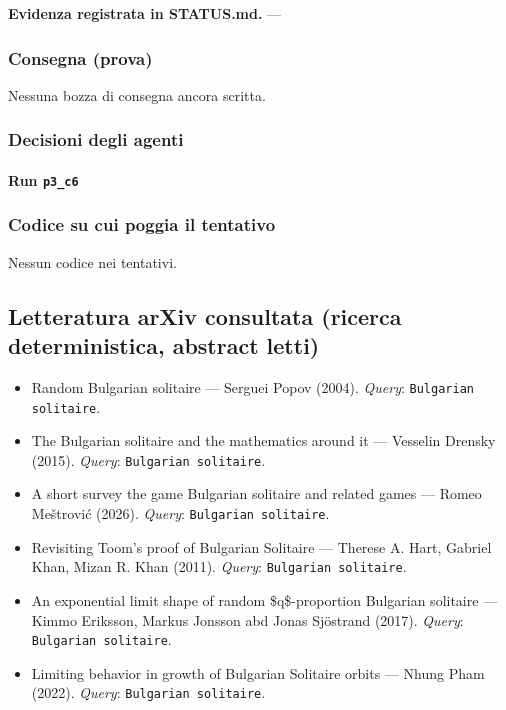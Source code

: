 \documentclass[11pt,a4paper]{article}
\begin{document}
\textbf{Evidenza registrata in STATUS.md.} —

\subsubsection{Consegna (prova)}
Nessuna bozza di consegna ancora scritta.

\subsubsection{Decisioni degli agenti}
\paragraph{Run \texttt{p3\_c6}}

\subsubsection{Codice su cui poggia il tentativo}
Nessun codice nei tentativi.

\subsection{Letteratura arXiv consultata (ricerca deterministica, abstract letti)}
\begin{itemize}
\item \cite{math/0401385v2} Random Bulgarian solitaire — Serguei Popov (2004). \emph{Query}: \texttt{Bulgarian solitaire}.
\item \cite{1503.00885v1} The Bulgarian solitaire and the mathematics around it — Vesselin Drensky (2015). \emph{Query}: \texttt{Bulgarian solitaire}.
\item \cite{2607.17194v1} A short survey the game Bulgarian solitaire and related games — Romeo Meštrović (2026). \emph{Query}: \texttt{Bulgarian solitaire}.
\item \cite{1101.1546v3} Revisiting Toom's proof of Bulgarian Solitaire — Therese A. Hart, Gabriel Khan, Mizan R. Khan (2011). \emph{Query}: \texttt{Bulgarian solitaire}.
\item \cite{1703.07102v1} An exponential limit shape of random \$q\$-proportion Bulgarian solitaire — Kimmo Eriksson, Markus Jonsson abd Jonas Sjöstrand (2017). \emph{Query}: \texttt{Bulgarian solitaire}.
\item \cite{2208.14496v1} Limiting behavior in growth of Bulgarian Solitaire orbits — Nhung Pham (2022). \emph{Query}: \texttt{Bulgarian solitaire}.
\end{itemize}
\end{document}

